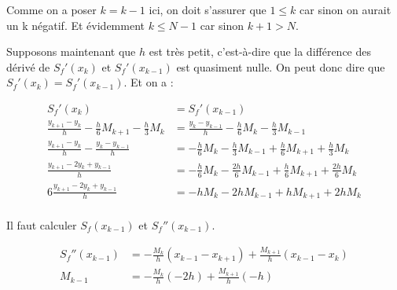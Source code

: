 \documentclass{article}
\begin{document}
\begin{enumerate}
\begin{enumerate}
    Comme on a poser $k = k - 1$ ici, on doit s'assurer que $1 \le k$
    car sinon on aurait un k négatif. Et évidemment $k \le N - 1$ car
    sinon $k + 1 > N$. \newline \newline

    Supposons maintenant que $h$ est très petit, c'est-à-dire que la
    différence des dérivé de $S_f'(x_k)$ et $S_f'(x_{k - 1})$ est
    quasiment nulle. On peut donc dire que $S_f'(x_k) = S_f'(x_{k -
      1})$. Et on a :

    \begin{equation*}
      \begin{split}
        S_f'(x_k) & = S_f'(x_{k - 1}) \\
        \frac{y_{k + 1} - y_k}{h} - \frac{h}{6} M_{k + 1} -
        \frac{h}{3} M_k
        & = \frac{y_k - y_{k - 1}}{h} - \frac{h}{6} M_k -
        \frac{h}{3} M_{k - 1} \\
        \frac{y_{k + 1} - y_k}{h} - \frac{y_k - y_{k - 1}}{h}
        & =  - \frac{h}{6} M_k - \frac{h}{3} M_{k - 1}
        + \frac{h}{6} M_{k + 1} + \frac{h}{3} M_k\\
        \frac{y_{k + 1} - 2 y_k + y_{k - 1}}{h}
        & =  - \frac{h}{6} M_k - \frac{2h}{6} M_{k - 1}
        + \frac{h}{6} M_{k + 1} + \frac{2h}{6} M_k\\
        6 \frac{y_{k + 1} - 2 y_k + y_{k - 1}}{h}
        & =  - h M_k - 2h M_{k - 1}
        + h M_{k + 1} + 2h M_k\\
      \end{split}
    \end{equation*}

    Il faut calculer $S_f(x_{k - 1})$ et $S_f''(x_{k - 1})$.

    \begin{equation*}
      \begin{split}
        S_f''(x_{k - 1}) & = - \frac{M_k}{h} (x_{k - 1} - x_{k + 1}) + 
        \frac{M_{k + 1}}{h} (x_{k - 1} - x_k)\\
        M_{k - 1} & = - \frac{M_k}{h} (-2h) + 
        \frac{M_{k + 1}}{h} (-h)\\
      \end{split}
    \end{equation*}


\end{enumerate}
\end{enumerate}
\end{document}
